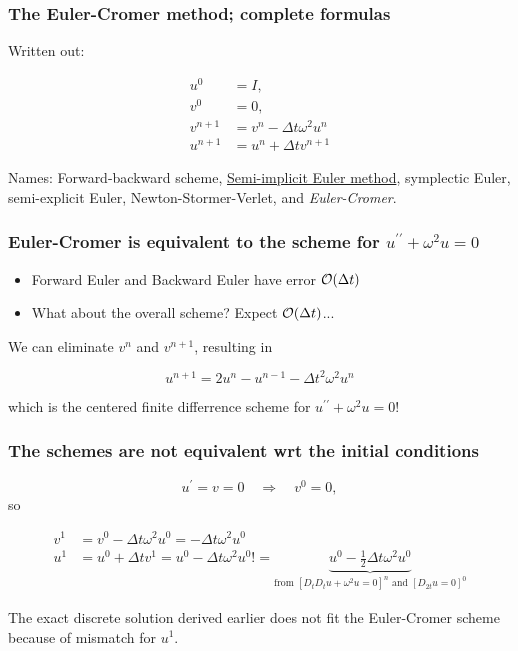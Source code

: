 \documentclass{beamer}
\begin{document}
\begin{frame}
\frametitle{The Euler-Cromer method; complete formulas}

Written out:

\begin{align}
u^0 &= I,\\ 
v^0 &= 0,\\ 
v^{n+1} &= v^n -\Delta t \omega^2u^{n}
\label{vib:model2x2:EulerCromer:veq1}\\ 
u^{n+1} &= u^n + \Delta t v^{n+1}
\label{vib:model2x2:EulerCromer:ueq1}
\end{align}

Names: Forward-backward scheme, \href{{http://en.wikipedia.org/wiki/Semi-implicit_Euler_method}}{Semi-implicit Euler method}, symplectic
Euler, semi-explicit Euler, Newton-Stormer-Verlet, and \emph{Euler-Cromer}.
\end{frame}

\begin{frame}
\frametitle{Euler-Cromer is equivalent to the scheme for $u^{\prime\prime}+\omega^2u=0$}

\begin{itemize}
 \item Forward Euler and Backward Euler have error $\Oof{\Delta t}$

 \item What about the overall scheme? Expect $\Oof{\Delta t}$...
\end{itemize}

\noindent
We can eliminate $v^n$ and $v^{n+1}$, resulting in

\[
u^{n+1} = 2u^n - u^{n-1} - \Delta t^2 \omega^2u^{n}
\]

which is the centered finite differrence scheme for $u^{\prime\prime}+\omega^2u=0$!
\end{frame}

\begin{frame}
\frametitle{The schemes are not equivalent wrt the initial conditions}

\[ u^{\prime}=v=0\quad\Rightarrow\quad v^0=0,\]
so

\begin{align*}
v^1 &= v^0 - \Delta t\omega^2 u^0 = - \Delta t\omega^2 u^0\\ 
u^1 &= u^0 + \Delta t v^1 = u^0 - \Delta t\omega^2 u^0 !=
\underbrace{u^0 - \frac{1}{2}\Delta t\omega^2 u^0}_{\mbox{from }[D_tD_t u +\omega^2 u=0]^n\mbox{ and }[D_{2t}u=0]^0}
\end{align*}

The exact discrete solution derived earlier does not fit the Euler-Cromer
scheme because of mismatch for $u^1$.
\end{frame}
\end{document}

